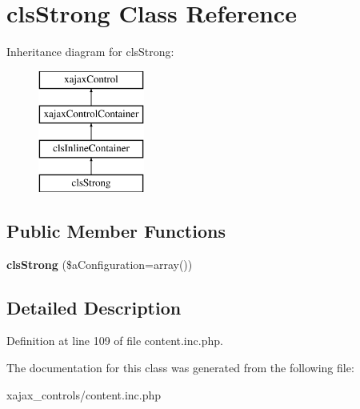 \hypertarget{classclsStrong}{
\section{clsStrong Class Reference}
\label{classclsStrong}
}
Inheritance diagram for clsStrong:\begin{figure}[H]
\begin{center}
\leavevmode
\includegraphics[height=4.000000cm]{classclsStrong}
\end{center}
\end{figure}
\subsection*{Public Member Functions}
\begin{DoxyCompactItemize}
\item 
\hypertarget{classclsStrong_ae5a8bcef2cb05a9f7faa76be1d73a60c}{
{\bfseries clsStrong} (\$aConfiguration=array())}
\label{classclsStrong_ae5a8bcef2cb05a9f7faa76be1d73a60c}

\end{DoxyCompactItemize}


\subsection{Detailed Description}


Definition at line 109 of file content.inc.php.



The documentation for this class was generated from the following file:\begin{DoxyCompactItemize}
\item 
xajax\_\-controls/content.inc.php\end{DoxyCompactItemize}
